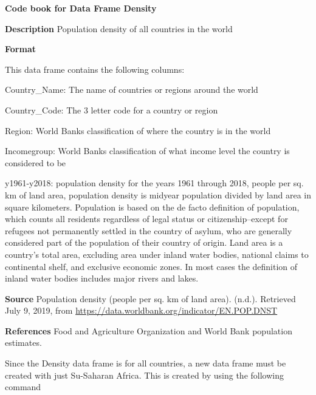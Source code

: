 \documentclass[]{book}
\newenvironment{Shaded}{\begin{snugshade}}{\end{snugshade}}
\newcommand{\KeywordTok}[1]{\textcolor[rgb]{0.13,0.29,0.53}{\textbf{#1}}}
\newcommand{\NormalTok}[1]{#1}
\newcommand{\OperatorTok}[1]{\textcolor[rgb]{0.81,0.36,0.00}{\textbf{#1}}}
\newcommand{\StringTok}[1]{\textcolor[rgb]{0.31,0.60,0.02}{#1}}
\begin{document}
\textbf{Code book for Data Frame Density}

\textbf{Description}
Population density of all countries in the world

\textbf{Format}

This data frame contains the following columns:

Country\_Name: The name of countries or regions around the world

Country\_Code: The 3 letter code for a country or region

Region: World Banks classification of where the country is in the world

Incomegroup: World Banks classification of what income level the country is considered to be

y1961-y2018: population density for the years 1961 through 2018, people per sq. km of land area, population density is midyear population divided by land area in square kilometers. Population is based on the de facto definition of population, which counts all residents regardless of legal status or citizenship--except for refugees not permanently settled in the country of asylum, who are generally considered part of the population of their country of origin. Land area is a country's total area, excluding area under inland water bodies, national claims to continental shelf, and exclusive economic zones. In most cases the definition of inland water bodies includes major rivers and lakes.

\textbf{Source}
Population density (people per sq. km of land area). (n.d.). Retrieved July 9, 2019, from \url{https://data.worldbank.org/indicator/EN.POP.DNST}

\textbf{References}
Food and Agriculture Organization and World Bank population estimates.

Since the Density data frame is for all countries, a new data frame must be created with just Su-Saharan Africa. This is created by using the following command

\begin{Shaded}
\end{Shaded}
\end{document}
